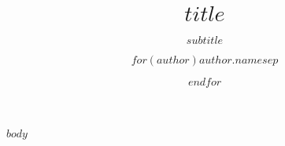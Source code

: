 \documentclass[ignorenonframetext]{beamer}
\title{$title$}
\subtitle{$subtitle$}
\author{$for(author)$$author.name$$sep$ \and $endfor$}
\begin{document}
\frame[plain]{\titlepage}

$body$
\end{document}
